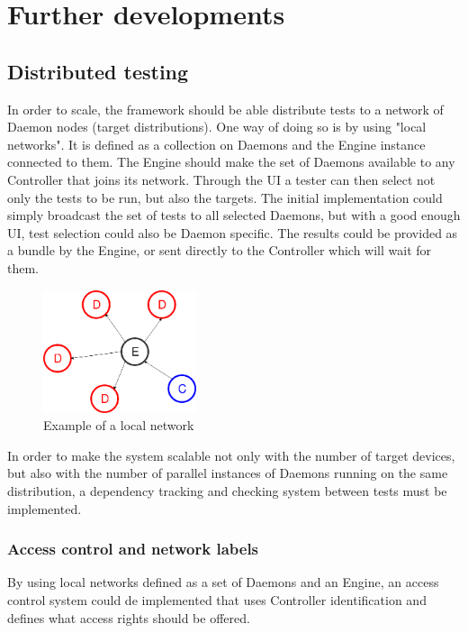\chapter{Further developments}

\section{Distributed testing}

In order to scale, the framework should be able distribute tests to a network of Daemon nodes (target distributions). One way of doing so is by using "local networks". It is defined as a collection on Daemons and the Engine instance connected to them. The Engine should make the set of Daemons available to any Controller that joins its network. Through the UI a tester can then select not only the tests to be run, but also the targets. The initial implementation could simply broadcast the set of tests to all selected Daemons, but with a good enough UI, test selection could also be Daemon specific. The results could be provided as a bundle by the Engine, or sent directly to the Controller which will wait for them.

\begin{figure}[h!]
  \centering
	\includegraphics[width=0.4\textwidth]{images/local.png}
    \caption{Example of a local network}
\end{figure}

In order to make the system scalable not only with the number of target devices, but also with the number of parallel instances of Daemons running on the same distribution, a dependency tracking and checking system between tests must be implemented. 

\subsection{Access control and network labels}

By using local networks defined as a set of Daemons and an Engine, an access control system could de implemented that uses Controller identification and defines what access rights should be offered.

